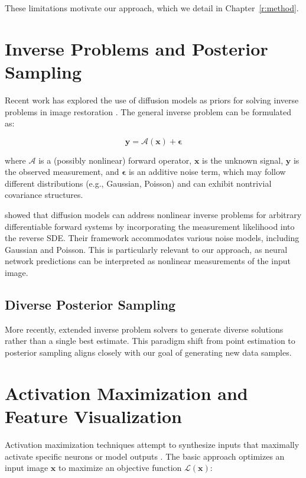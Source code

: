 \documentclass[licencjacka,en]{pracamgr}
\begin{document}
These limitations motivate our approach, which we detail in Chapter~\ref{r:method}.

\section{Inverse Problems and Posterior Sampling}

Recent work has explored the use of diffusion models as priors for solving inverse problems in image restoration \citep{song2023pseudoinverse, chung2024diffusionposteriorsamplinggeneral}. The general inverse problem can be formulated as:

\begin{equation}
\mathbf{y} = \mathcal{A}(\mathbf{x}) + \boldsymbol{\epsilon}
\label{eq:inverse_problem}
\end{equation}

where $\mathcal{A}$ is a (possibly nonlinear) forward operator, $\mathbf{x}$ is the unknown signal, $\mathbf{y}$ is the observed measurement, and $\boldsymbol{\epsilon}$ is an additive noise term, which may follow different distributions (e.g., Gaussian, Poisson) and can exhibit nontrivial covariance structures.

\citep{chung2024diffusionposteriorsamplinggeneral} showed that diffusion models can address nonlinear inverse problems for arbitrary differentiable forward systems by incorporating the measurement likelihood into the reverse SDE. Their framework accommodates various noise models, including Gaussian and Poisson. This is particularly relevant to our approach, as neural network predictions can be interpreted as nonlinear measurements of the input image.

\subsection{Diverse Posterior Sampling}

More recently, \citep{cohen2024posteriorsamplingmeaningfuldiversity} extended inverse problem solvers to generate diverse solutions rather than a single best estimate. This paradigm shift from point estimation to posterior sampling aligns closely with our goal of generating new data samples.

\section{Activation Maximization and Feature Visualization}

Activation maximization techniques attempt to synthesize inputs that maximally activate specific neurons or model outputs \citep{erhan2009visualizing, mordvintsev2015deepdream}. The basic approach optimizes an input image $\mathbf{x}$ to maximize an objective function $\mathcal{L}(\mathbf{x})$:
\end{document}
